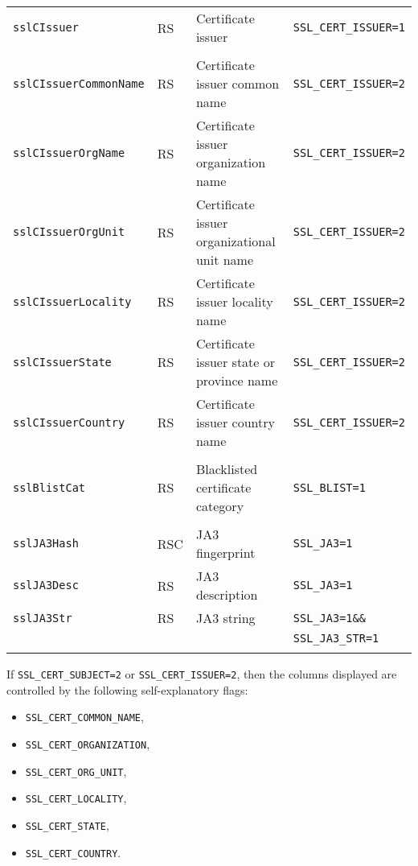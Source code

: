 \documentclass[documentation]{subfiles}
\begin{document}
\begin{longtable}{llll}
    {\tt sslCIssuer}             & RS & Certificate issuer                          & {\small\tt SSL\_CERT\_ISSUER=1}\\\\
    {\tt sslCIssuerCommonName}   & RS & Certificate issuer common name              & {\small\tt SSL\_CERT\_ISSUER=2}\\
    {\tt sslCIssuerOrgName}      & RS & Certificate issuer organization name        & {\small\tt SSL\_CERT\_ISSUER=2}\\
    {\tt sslCIssuerOrgUnit}      & RS & Certificate issuer organizational unit name & {\small\tt SSL\_CERT\_ISSUER=2}\\
    {\tt sslCIssuerLocality}     & RS & Certificate issuer locality name            & {\small\tt SSL\_CERT\_ISSUER=2}\\
    {\tt sslCIssuerState}        & RS & Certificate issuer state or province name   & {\small\tt SSL\_CERT\_ISSUER=2}\\
    {\tt sslCIssuerCountry}      & RS & Certificate issuer country name             & {\small\tt SSL\_CERT\_ISSUER=2}\\\\

    {\tt sslBlistCat}            & RS  & Blacklisted certificate category & {\small\tt SSL\_BLIST=1}\\\\

    {\tt sslJA3Hash}             & RSC & JA3 fingerprint                  & {\small\tt SSL\_JA3=1}\\
    {\tt sslJA3Desc}             & RS  & JA3 description                  & {\small\tt SSL\_JA3=1}\\
    {\tt sslJA3Str}              & RS  & JA3 string                       & {\small\tt SSL\_JA3=1\&\&}\\
                                 &     &                                  & {\small\tt SSL\_JA3\_STR=1}\\\\
    \bottomrule
\end{longtable}

If {\tt SSL\_CERT\_SUBJECT=2} or {\tt SSL\_CERT\_ISSUER=2}, then the columns displayed are controlled by the following self-explanatory flags:
\begin{itemize}
    \item {\tt SSL\_CERT\_COMMON\_NAME},
    \item {\tt SSL\_CERT\_ORGANIZATION},
    \item {\tt SSL\_CERT\_ORG\_UNIT},
    \item {\tt SSL\_CERT\_LOCALITY},
    \item {\tt SSL\_CERT\_STATE},
    \item {\tt SSL\_CERT\_COUNTRY}.
\end{itemize}
\end{document}
